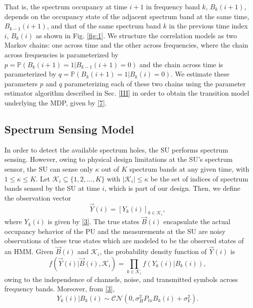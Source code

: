 \documentclass[10pt,twocolumn]{IEEEtran}
\begin{document}
That is, the spectrum occupancy at time $i+1$ in frequency band $k$, $B_{k}(i+1)$, depends on the  occupancy state of the adjacent spectrum band at the same time, $B_{k-1}(i+1)$, and that of the same spectrum band $k$ in the previous time index $i$, $B_{k}(i)$ as shown in Fig. \ref{fig:1}. We structure the correlation models as two Markov chains: one across time and the other across frequencies, where the chain across frequencies is parameterized by $p{=}\mathbb{P}(B_{k}(i+1){=}1|B_{k-1}(i+1){=}0)$ and the chain across time is parameterized by $q{=}\mathbb{P}(B_{k}(i+1){=}1|B_{k}(i){=}0)$. We estimate these parameters $p$ and $q$ parameterizing each of these two chains using the parameter estimator algorithm described in Sec. \ref{III} in order to obtain the transition model underlying the MDP, given by \eqref{7}.
\vspace{-3mm}
\subsection{Spectrum Sensing Model}
In order to detect the available spectrum holes, the SU performs spectrum sensing. However, owing to physical design limitations at the SU's spectrum sensor, the SU can sense only $\kappa$ out of $K$ spectrum bands at any given time, with $1{\leq}\kappa{\leq}K$. Let $\mathcal K_{i}{\subseteq}\{1,2,\dots,K\}$ with $|\mathcal K_i|{\leq}\kappa$ be the set of indices of spectrum bands sensed by the SU at time $i$, which is part of our design.
Then, we define the observation vector
\begin{equation}\label{8}
    \vec{Y}(i) = [Y_k(i)]_{k {\in} \mathcal K_i},
\end{equation}
where $Y_k(i)$ is given by \eqref{3}.
The true states $\vec{B}(i)$ encapsulate the actual occupancy behavior of the PU and the measurements at the SU are noisy observations of these true states which are modeled to be the observed states of an HMM. Given $\vec{B}(i)$ and $\mathcal K_i$, the probability density function of $\vec{Y}(i)$ is
\begin{equation}\label{9}
    f(\vec{Y}(i)|\vec{B}(i), \mathcal K_i) = \prod_{k \in \mathcal K_i} f(Y_k(i)|B_k(i)),
\end{equation}
owing to the independence of channels, noise, and transmitted symbols across frequency bands. Moreover, from \eqref{3},
\begin{equation}\label{10}
 Y_k(i)|B_k(i) \sim \mathcal{CN}(0, \sigma_H^2P_{tx}B_k(i) + \sigma_V^2).
\end{equation}
\end{document}
